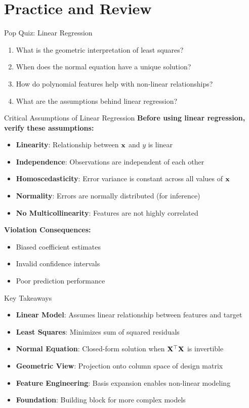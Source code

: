 \documentclass{beamer}
\begin{document}
\section{Practice and Review}

\begin{frame}{Pop Quiz: Linear Regression}
\begin{enumerate}
\item What is the geometric interpretation of least squares?
\pause
\item When does the normal equation have a unique solution?
\pause
\item How do polynomial features help with non-linear relationships?
\pause
\item What are the assumptions behind linear regression?
\end{enumerate}
\end{frame}

\begin{frame}{Critical Assumptions of Linear Regression}
\textbf{Before using linear regression, verify these assumptions:}
\begin{itemize}[<+->]
\item \textbf{Linearity}: Relationship between $\mathbf{x}$ and $y$ is linear
\item \textbf{Independence}: Observations are independent of each other
\item \textbf{Homoscedasticity}: Error variance is constant across all values of $\mathbf{x}$
\item \textbf{Normality}: Errors are normally distributed (for inference)
\item \textbf{No Multicollinearity}: Features are not highly correlated
\end{itemize}

\pause
\textbf{Violation Consequences:}
\begin{itemize}[<+->]
\item Biased coefficient estimates
\item Invalid confidence intervals
\item Poor prediction performance
\end{itemize}
\end{frame}

\begin{frame}{Key Takeaways}
\begin{itemize}[<+->]
\item \textbf{Linear Model}: Assumes linear relationship between features and target
\item \textbf{Least Squares}: Minimizes sum of squared residuals
\item \textbf{Normal Equation}: Closed-form solution when $\mathbf{X}^\top\mathbf{X}$ is invertible
\item \textbf{Geometric View}: Projection onto column space of design matrix
\item \textbf{Feature Engineering}: Basis expansion enables non-linear modeling
\item \textbf{Foundation}: Building block for more complex models
\end{itemize}
\end{frame}
\end{document}
